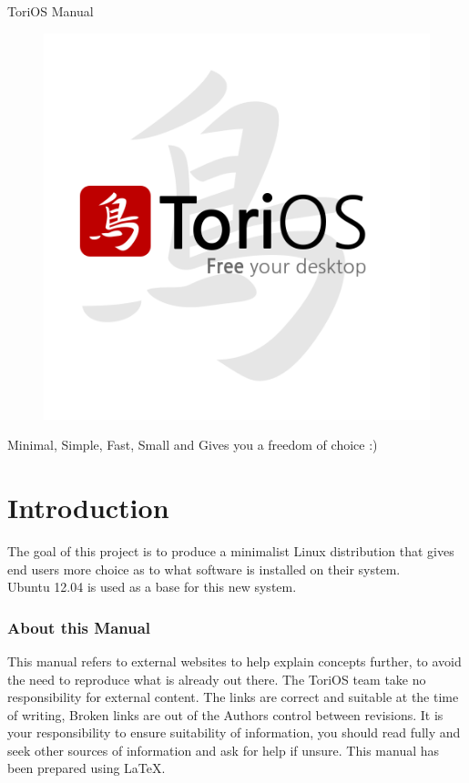 \documentclass[12pt,a4paper]{book}
\author{Paul Sutton}
\begin{document}
\begin{center}
{\Huge ToriOS Manual}
\end{center}
\begin{figure}
\centering
\includegraphics[width=0.7\linewidth]{./FinalLogo}
\caption{}
\label{fig:FinalLogo}
\end{figure}


\begin{center}
Minimal, Simple, Fast, Small and Gives you a freedom of choice :)
\end{center}
\tableofcontents
\chapter{Introduction}
The goal of this project is to produce a minimalist Linux distribution that gives end users more choice as to what software is installed on their system.\\

Ubuntu 12.04 is used as a base for this new system.
\subsection{About this Manual}
This manual refers to external websites to help explain concepts further, to avoid the need to reproduce what is already out there.  The ToriOS team take no responsibility for external content.  The links are correct and suitable at the time of writing,  Broken links are out of the Authors control between revisions.  It is your responsibility to ensure suitability of information, you should read fully and seek other sources of information and ask for help if unsure.  
This manual has been prepared using \LaTeX. 
\end{document}
